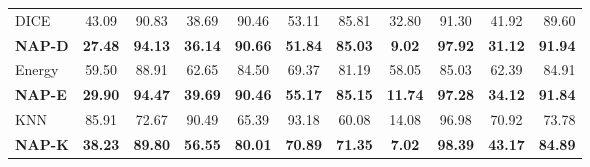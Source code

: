 \begin{table}[!t]
{\begin{tabular}{LcccccccccR}
DICE~\cite{sun2022dice}                             & 43.09          & 90.83                              & 38.69                              & 90.46                              & 53.11                              & 85.81                              & 32.80                              & 91.30                              & 41.92          & 89.60                              \\
\textbf{NAP-D}                                       & \textbf{27.48}          &  \textbf{94.13}                             &  \textbf{36.14}                    &  \textbf{90.66}                    &  \textbf{51.84}                    &  \textbf{85.03}                    &   \textbf{9.02}                            &  \textbf{97.92}                             & \textbf{31.12} &  \textbf{91.94}                    \\ 
Energy~\cite{liu2020energy}                          & 59.50          & 88.91                              & 62.65                              & 84.50                              & 69.37                              & 81.19                              & 58.05                              & 85.03                              & 62.39          & 84.91                              \\
\textbf{NAP-E}                                       & \textbf{29.90}          & \textbf{94.47}                              & \textbf{39.69}                              & \textbf{90.46}                              & \textbf{55.17}                              & \textbf{85.15}                              & \textbf{11.74}                              & \textbf{97.28}                              & \textbf{34.12}          & \textbf{91.84}    \\ 
KNN~\cite{sun2022knn}                          & 85.91          & 72.67                              & 90.49                              & 65.39                              & 93.18                              & 60.08                              & 14.08                              & 96.98                              & 70.92          & 73.78                              \\
\textbf{NAP-K}                                       & \textbf{38.23}          & \textbf{89.80}                              & \textbf{56.55}                     & \textbf{80.01}                     & \textbf{70.89}                     & \textbf{71.35}                     & \textbf{7.02}                              & \textbf{98.39}                              & \textbf{43.17} & \textbf{84.89}                     \\ 

\end{tabular}}
\end{table}
